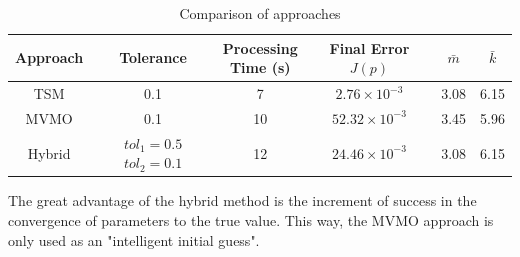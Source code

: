 \begin{table}[h]
	\caption{Comparison of approaches}
	\begin{center}
	\begin{tabular}{c|ccccc}
		Approach & Tolerance & \shortstack{Processing \\ Time (s)} & \shortstack{Final Error \\ $J(p)$} & $\bar{m}$ & $\bar{k}$ \\
		\hline
		TSM  & 0.1 & 7  & $2.76\times 10^{-3}$ & 3.08 & 6.15 \\
		MVMO  & 0.1 & 10 & $52.32\times 10^{-3}$ & 3.45 & 5.96 \\
		Hybrid  & \shortstack{$tol_{1}=0.5$ \\ $tol_{2}=0.1$} & 12 & $24.46\times 10^{-3}$ & 3.08 & 6.15
	\end{tabular}
	\end{center}
	\label{tab: SM}
\end{table}

The great advantage of the hybrid method is the increment of success in the convergence of parameters to the true value. This way, the MVMO approach is only used as an "intelligent initial guess".
